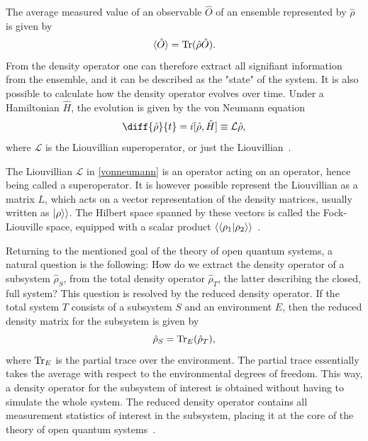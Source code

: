 \documentclass[../main.tex]{subfiles}
\begin{document}
The average measured value of an observable $\hat O$ of an ensemble represented by $\hat\rho$ is given by
\begin{equation}\label{eq:expec}
    \braket{\hat O} = \operatorname{Tr}({\hat\rho \hat O}).
\end{equation}
From the density operator one can therefore extract all signifiant information from the ensemble, and it can be described as the "state" of the system. It is also possible to calculate how the density operator evolves over time. Under a Hamiltonian $\hat H$, the evolution is given by the von Neumann equation
\begin{equation}\label{vonneumann}
    \diff{\hat\rho}{t} = i[\hat \rho, \hat H] \equiv \mathcal{L}\hat\rho,
\end{equation}
where $\mathcal{L}$ is the Liouvillian superoperator, or just the Liouvillian~\cite{bookopen}. 

The Liouvillian $\mathcal{L}$ in \cref{vonneumann} is an operator acting on an operator, hence being called a superoperator. It is however possible represent the Liouvillian as a matrix $L$, which acts on a vector representation of the density matrices, usually written as $\ket{\rho}\rangle$. The Hilbert space spanned by these vectors is called the Fock-Liouville space, equipped with a scalar product $\langle\braket{\rho_1|\rho_2}\rangle$~\cite{lindblad}. 

Returning to the mentioned goal of the theory of open quantum systems, a natural question is the following: How do we extract the density operator of a subsystem $\hat\rho_S$, from the total density operator $\hat\rho_T$, the latter describing the closed, full system? This question is resolved by the reduced density operator. If the total system $T$ consists of a subsystem $S$ and an environment $E$, then the reduced density matrix for the subsystem is given by
\begin{equation}
    \hat\rho_S = \operatorname{Tr}_E({\hat\rho_T}),
\end{equation}
where $\operatorname{Tr}_E$ is the partial trace over the environment. The partial trace essentially takes the average with respect to the environmental degrees of freedom. This way, a density operator for the subsystem of interest is obtained without having to simulate the whole system. The reduced density operator contains all measurement statistics of interest in the subsystem, placing it at the core of the theory of open quantum systems~\cite{bookopen}.
\end{document}
